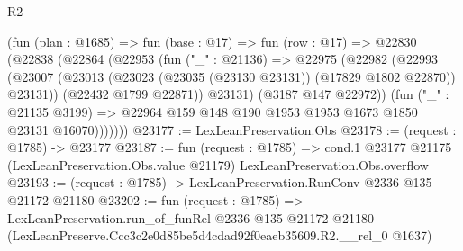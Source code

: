 \begin{lexlean}{R2}
\begin{coremodule}
        (fun (plan : @1685) =>
        fun (base : @17) =>
        fun (row : @17) =>
        @22830
          (@22838
            (@22864
              (@22953
                (fun ("_" : @21136) =>
                @22975
                  (@22982
                    (@22993
                      (@23007
                        (@23013 (@23023 (@23035 (@23130 @23131)) (@17829 @1802 @22870)) @23131))
                      (@22432 @1799 @22871))
                    @23131)
                  (@3187 @147 @22972))
                (fun ("_" : @21135 @3199) =>
                @22964 @159 @148 @190 @1953 @1953 @1673 @1850 @23131 @16070)))))))
@23177 := LexLeanPreservation.Obs
@23178 := (request : @1785) -> @23177
@23187 := fun (request : @1785) =>
  cond.{1} @23177 @21175 (LexLeanPreservation.Obs.value @21179) LexLeanPreservation.Obs.overflow
@23193 := (request : @1785) -> LexLeanPreservation.RunConv @2336 @135 @21172 @21180
@23202 := fun (request : @1785) =>
  LexLeanPreservation.run_of_funRel
    @2336
    @135
    @21172
    @21180
    (LexLeanPreserve.Ccc3c2e0d85be5d4cdad92f0eaeb35609.R2.__rel_0 @1637)
\end{coremodule}
\end{lexlean}
